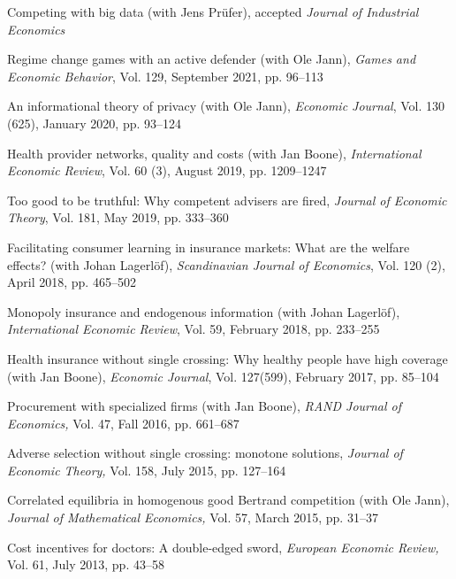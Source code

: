 \documentclass[a4paper]{article}
\renewenvironment{itemize}{
  \begin{list}{}{
    \setlength{\leftmargin}{1.5em}
  }
}{
  \end{list}
}
\begin{document}
%
\begin{itemize}
  
\item Competing with big data (with Jens Pr\"ufer), accepted \emph{Journal of Industrial Economics}
  
\item Regime change games with an active defender (with Ole Jann), \emph{Games and Economic Behavior}, Vol. 129, September 2021, pp. 96--113
  
\item An informational theory of privacy (with Ole Jann), \emph{Economic Journal}, Vol. 130 (625), January 2020, pp. 93--124
  
\item Health provider networks, quality and costs (with Jan Boone), \emph{International Economic Review}, Vol. 60 (3), August 2019, pp. 1209--1247

\item Too good to be truthful: Why competent advisers are fired, \emph{Journal of Economic Theory}, Vol. 181, May 2019, pp. 333--360
  
\item Facilitating consumer learning in insurance markets: What are the welfare effects? (with Johan Lagerl\"of), \emph{Scandinavian Journal of Economics}, Vol. 120 (2), April 2018, pp. 465--502
  
\item Monopoly insurance and endogenous information (with Johan Lagerl\"of), \emph{International Economic Review}, Vol. 59, February 2018, pp. 233--255

\item Health insurance without single crossing: Why healthy
people have high coverage (with Jan Boone), \textit{Economic Journal}, Vol. 127(599), February 2017, pp. 85--104

\item Procurement with specialized firms (with Jan Boone), \textit{RAND Journal of Economics,} Vol. 47, Fall 2016, pp. 661--687

\item Adverse selection without single crossing: monotone solutions, \textit{Journal of Economic Theory,} Vol. 158, July 2015, pp. 127--164

\item Correlated equilibria in homogenous good Bertrand competition (with Ole Jann), \textit{Journal of Mathematical Economics,}  Vol. 57, March 2015, pp. 31--37

\item Cost incentives for doctors: A double-edged sword, \textit{European Economic Review,} Vol. 61, July 2013, pp. 43--58

\end{itemize}
\end{document}
